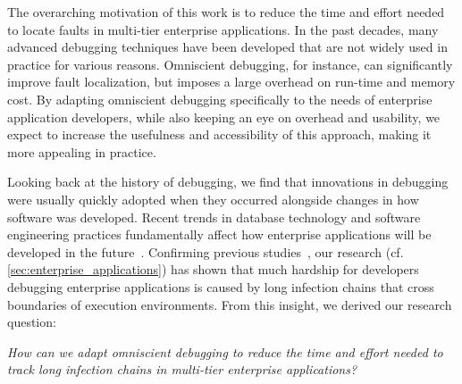 \newcommand{\RQ}[1]{\subsection*{\textsl{#1}}}

The overarching motivation of this work is to reduce the time and effort needed to locate faults in multi-tier enterprise applications.
In the past decades, many advanced debugging techniques have been developed that are not widely used in practice for various reasons.
Omniscient debugging, for instance, can significantly improve fault localization, but imposes a large overhead on run-time and memory cost.
By adapting omniscient debugging specifically to the needs of enterprise application developers,
while also keeping an eye on overhead and usability, we expect to increase the usefulness and accessibility of this approach, making it more appealing in practice.

Looking back at the history of debugging, we find that innovations in debugging were usually quickly adopted when they occurred alongside changes in how software was developed.
Recent trends in database technology and software engineering practices fundamentally affect how enterprise applications will be developed in the future~\cite{plattner15:the_in-memory_revolution_how}.
Confirming previous studies~\cite{eisenstadt97:my_hairiest_bug_war, perscheid17:studying_the_advancement}, our research (cf. \cref{sec:enterprise_applications}) has shown that much hardship for developers debugging enterprise applications is caused by long infection chains that cross boundaries of execution environments.
From this insight, we derived our research question:

\medskip
\noindent
\emph{How can we adapt omniscient debugging to reduce the time and effort needed to track long infection chains in multi-tier enterprise applications?}
\medskip

